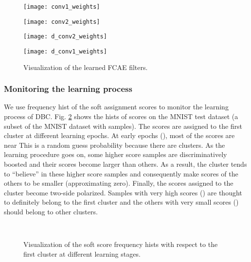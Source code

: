 \documentclass[preprint,12pt]{elsarticle}
\begin{document}
\begin{figure}[!htb]
\centering
\begin{minipage}{0.22\linewidth}
\texttt{[image: conv1\_weights]}
\end{minipage}\quad
\begin{minipage}{0.22\linewidth}
\texttt{[image: conv2\_weights]}
\end{minipage}\quad
\begin{minipage}{0.22\linewidth}
\texttt{[image: d\_conv2\_weights]}
\end{minipage}\quad
\begin{minipage}{0.22\linewidth}
\texttt{[image: d\_conv1\_weights]}
\end{minipage}
\text{~~~~~~~~~~~~~~~~~~~~~~~~~~~~~~~~~~~~~~~~~~~~~~~~~~~~~~~}
\caption{Visualization of the learned FCAE filters.}\label{fig:vis-weights}
\end{figure}



\subsubsection{Monitoring the learning process}\label{sec:process}


We use frequency hist of the soft assignment scores to monitor the learning process of DBC.
Fig. \ref{fig:vis-hist} shows the hists of scores on the MNIST test dataset (a subset of the MNIST dataset
with  samples). The scores are assigned to the first cluster at different learning epochs.
At early epochs (), most of the scores are near  This is a random guess probability because
there are  clusters. As the learning procedure goes on, some higher score samples are discriminatively boosted
and their scores become larger than others. As a result, the cluster tends to ``believe'' in these higher score
samples and consequently make scores of the others to be smaller (approximating zero). Finally, the scores
assigned to the cluster become two-side polarized. Samples with very high scores () are thought
to definitely belong to the first cluster and the others with very small scores ()
should belong to other clusters.

\begin{figure}[!htb]
\centering
{}\\
\caption{Visualization of the soft score frequency hists with respect to the first cluster
at different learning stages.}\label{fig:vis-hist}
\end{figure}
\end{document}
